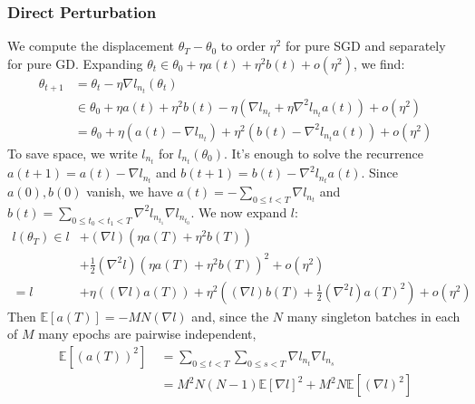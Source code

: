 \documentclass{article}
\newcommand{\expct}[1]{\mathbb{E}\left[#1\right]}
\begin{document}
        \subsubsection*{Direct Perturbation} 
        We compute the displacement $\theta_T-\theta_0$ to order $\eta^2$ 
        for pure SGD and separately for pure GD.  Expanding
        $
            \theta_t \in \theta_0 + \eta a(t) + \eta^2 b(t) + o(\eta^2)
        $, we find:
        \begin{align*}
            \theta_{t+1} &=     \theta_t - \eta \nabla l_{n_t} (\theta_t) \\
                         &\in       \theta_0
                                +   \eta a(t) + \eta^2 b(t)
                                -   \eta (
                                            \nabla l_{n_t}
                                        +   \eta \nabla^2 l_{n_t} a(t) 
                                    )
                                +   o(\eta^2) \\
                         &=     \theta_0
                            +   \eta (a(t) - \nabla l_{n_t})
                            +   \eta^2 (b(t) - \nabla^2 l_{n_t} a(t)) 
                            +   o(\eta^2)
        \end{align*}
        To save space, we write $l_{n_t}$ for $l_{n_t}(\theta_0)$.
        It's enough to solve the recurrence $a(t+1) = a(t) - \nabla l_{n_t}$
        and $b(t+1) = b(t) - \nabla^2 l_{n_t} a(t)$.  Since $a(0), b(0)$
        vanish, we have $a(t) =-\sum_{0\leq t<T} \nabla l_{n_t}$ and $b(t) =
        \sum_{0\leq t_0 < t_1 < T} \nabla^2 l_{n_{t_1}} \nabla l_{n_{t_0}}$.
        We now expand $l$:
        \begin{align*}
            l(\theta_T) \in    l   &+   (\nabla l) (\eta a(T) + \eta^2 b(T)) \\
                                   &+   \frac{1}{2} (\nabla^2 l) (\eta a(T) + \eta^2 b(T))^2
                                    +   o(\eta^2) \\
                        =      l   &+   \eta ((\nabla l) a(T))
                                    +   \eta^2 ((\nabla l) b(T) + \frac{1}{2} (\nabla^2 l) a(T)^2 )
                                    +   o(\eta^2)
        \end{align*}
        Then $\expct{a(T)} = -MN(\nabla l)$ and, since the $N$ many
        singleton batches in each of $M$ many epochs are pairwise independent,
        \begin{align*}
            \expct{(a(T))^2}
            ~&=
            \sum_{0\leq t<T} \sum_{0\leq s<T} \nabla l_{n_t} \nabla l_{n_s} \\
            ~&= 
            M^2N(N-1)   \expct{\nabla l}^2 +
            M^2N        \expct{(\nabla l)^2}
        \end{align*}
\end{document}
